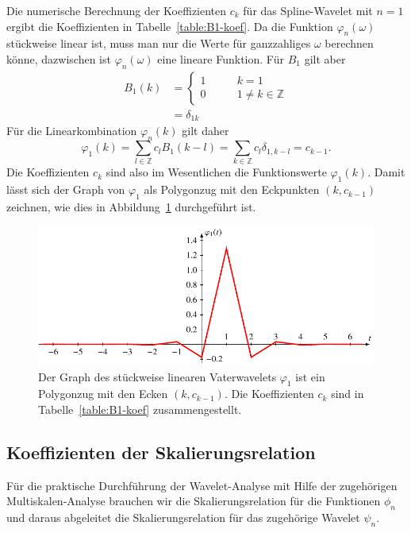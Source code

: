 \begin{beispiel}
Die numerische Berechnung der Koeffizienten $c_k$ für das Spline-Wavelet 
mit $n=1$ ergibt die Koeffizienten in Tabelle~\ref{table:B1-koef}.
Da die Funktion $\varphi_n(\omega)$ stückweise linear ist, muss man nur die
Werte für ganzzahliges $\omega$ berechnen könne, dazwischen ist
$\varphi_n(\omega)$ eine lineare Funktion.
Für $B_1$ gilt aber
\begin{align*}
B_1(k)
&=
\begin{cases}
1&\qquad k=1\\
0&\qquad 1\ne k\in\mathbb Z
\end{cases}
\\
&=\delta_{1k}
\end{align*}
Für die Linearkombination $\varphi_n(k)$ gilt daher
\[
\varphi_1(k)
=
\sum_{l\in\mathbb Z} c_l B_1(k-l)
=
\sum_{k\in\mathbb Z} c_l \delta_{1,k-l}
=
c_{k-1}.
\]
Die Koeffizienten $c_k$ sind also im Wesentlichen die Funktionswerte
$\varphi_1(k)$.
Damit lässt sich der Graph von $\varphi_1$ als Polygonzug mit den Eckpunkten
$(k,c_{k-1})$ zeichnen, wie dies in Abbildung~\ref{phi1:polygonzug}
durchgeführt ist.
\begin{figure}
\centering
\includegraphics{chapters/9-spline/images/Bphi1.pdf}
\caption{Der Graph des stückweise linearen Vaterwavelets $\varphi_1$
ist ein Polygonzug mit den Ecken $(k,c_{k-1})$.
Die Koeffizienten $c_k$ sind in Tabelle~\ref{table:B1-koef} 
zusammengestellt.
\label{phi1:polygonzug}}
\end{figure}
\end{beispiel}

\subsection{Koeffizienten der Skalierungsrelation
\label{subsection:spline-skalierungskoeffizienten}}
Für die praktische Durchführung der Wavelet-Analyse mit Hilfe der
zugehörigen Multiskalen-Ana\-ly\-se brauchen wir die Skalierungsrelation 
für die Funktionen $\phi_n$ und daraus abgeleitet die
Skalierungsrelation für das zugehörige Wavelet $\psi_n$.


